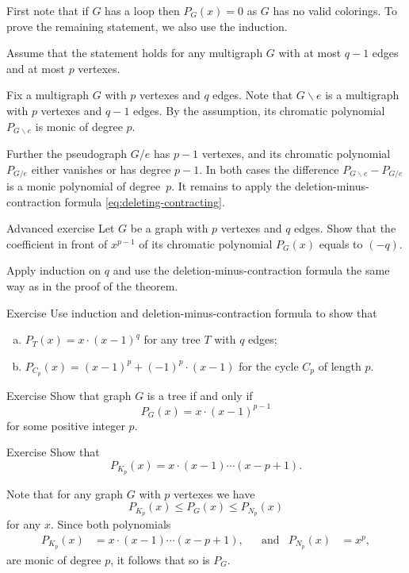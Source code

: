 First note that if $G$ has a loop then $P_G(x)=0$ as $G$ has no valid colorings.
To prove the remaining statement, we also use the induction.

Assume that the statement holds for any multigraph $G$ with at most $q-1$ edges and at most $p$ vertexes.

Fix a multigraph $G$ with $p$ vertexes and $q$ edges.
Note that $G\backslash e$ is a multigraph with $p$ vertexes and $q-1$ edges.
By the assumption, its chromatic polynomial $P_{G\backslash e}$ is monic of degree $p$.

Further the pseudograph $G/e$ has $p-1$ vertexes,
and its chromatic polynomial $P_{G/e}$ either vanishes or has degree $p-1$.
In both cases the difference $P_{G\backslash e}-P_{G/e}$ is a monic polynomial of degree~$p$.
It remains to apply the deletion-minus-contraction formula \ref{eq:deleting-contracting}.
\qeds

\begin{thm}{Advanced exercise}
Let $G$ be a graph with $p$ vertexes and $q$ edges.
Show that the coefficient in front of $x^{p-1}$ of its chromatic polynomial $P_G(x)$ equals to $(-q)$.
\end{thm}

 Apply induction on $q$ and use the deletion-minus-contraction formula the same way as in the proof of the theorem.

\begin{thm}{Exercise}
Use induction and  deletion-minus-contraction formula to show that 
\begin{enumerate}[(a)]
\item $P_{T}(x)=x\cdot(x-1)^q$ for any tree $T$ with $q$ edges;
\item $P_{C_p}(x)=(x-1)^p+(-1)^p\cdot(x-1)$ for the cycle $C_p$ of length $p$.
\end{enumerate}
\end{thm}


\begin{thm}{Exercise} Show that graph $G$ is a tree if and only if \[P_G(x)= x\cdot(x-1)^{p-1}\] for some positive integer $p$.
\end{thm}

\begin{thm}{Exercise}\label{ex:chrom(K_p)}
Show that 
\[P_{K_p}(x)=x\cdot(x-1)\cdots(x-p+1).\]

\end{thm}

Note that for any graph $G$ with $p$ vertexes we have
\[P_{K_p}(x)\le P_G(x)\le P_{N_p}(x)\]
for any $x$.
Since both polynomials
\begin{align*}
P_{K_p}(x)&=x\cdot(x-1)\cdots(x-p+1),&&
\text{and}
&
P_{N_p}(x)&=x^p,
\end{align*}
are monic of degree $p$,
it follows that so is $P_G$.

